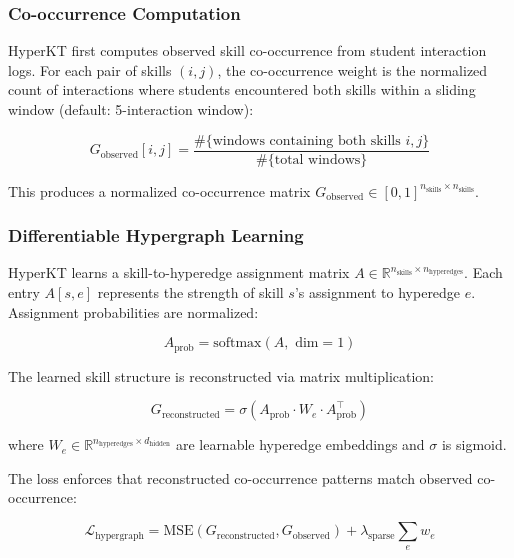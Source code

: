 \documentclass[10pt,twocolumn]{article}
\begin{document}
\subsubsection{Co-occurrence Computation}
HyperKT first computes observed skill co-occurrence from student interaction logs. For each pair of skills $(i, j)$, the co-occurrence weight is the normalized count of interactions where students encountered both skills within a sliding window (default: 5-interaction window):

\begin{equation}
G_{\text{observed}}[i,j] = \frac{\#\{\text{windows containing both skills } i, j\}}{\#\{\text{total windows}\}}
\end{equation}

This produces a normalized co-occurrence matrix $G_{\text{observed}} \in [0,1]^{n_{\text{skills}} \times n_{\text{skills}}}$.

\subsubsection{Differentiable Hypergraph Learning}
HyperKT learns a skill-to-hyperedge assignment matrix $A \in \mathbb{R}^{n_{\text{skills}} \times n_{\text{hyperedges}}}$. Each entry $A[s, e]$ represents the strength of skill $s$'s assignment to hyperedge $e$. Assignment probabilities are normalized:

\begin{equation}
A_{\text{prob}} = \text{softmax}(A, \text{ dim}=1)
\end{equation}

The learned skill structure is reconstructed via matrix multiplication:

\begin{equation}
G_{\text{reconstructed}} = \sigma(A_{\text{prob}} \cdot W_e \cdot A_{\text{prob}}^{\top})
\end{equation}

where $W_e \in \mathbb{R}^{n_{\text{hyperedges}} \times d_{\text{hidden}}}$ are learnable hyperedge embeddings and $\sigma$ is sigmoid.

The loss enforces that reconstructed co-occurrence patterns match observed co-occurrence:

\begin{equation}
\mathcal{L}_{\text{hypergraph}} = \text{MSE}(G_{\text{reconstructed}}, G_{\text{observed}}) + \lambda_{\text{sparse}} \sum_e w_e
\end{equation}
\end{document}
